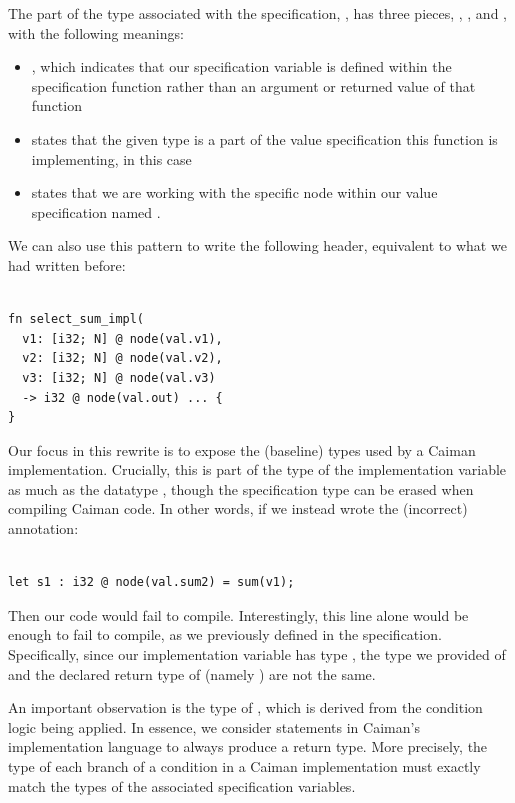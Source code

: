 The part of the type associated with the specification, , has three pieces, , , and , with the following meanings:
%
\begin{itemize}
	\item {}, which indicates that our specification variable is defined within the specification function rather than an argument or returned value of that function
	\item {} states that the given type is a part of the value specification this function is implementing,  in this case
	\item {} states that we are working with the specific node within our value specification named .
\end{itemize}
%
We can also use this pattern to write the following header, equivalent to what we had written before:
%
\begin{lstlisting}

fn select_sum_impl(
  v1: [i32; N] @ node(val.v1),
  v2: [i32; N] @ node(val.v2),
  v3: [i32; N] @ node(val.v3)
  -> i32 @ node(val.out) ... {
}
\end{lstlisting}
%
Our focus in this rewrite is to expose the (baseline) types used by a Caiman implementation. Crucially, this is part of the type of the implementation variable as much as the datatype , though the specification type can be erased when compiling Caiman code.  In other words, if we instead wrote the (incorrect) annotation:
%
\begin{lstlisting}

let s1 : i32 @ node(val.sum2) = sum(v1);
\end{lstlisting}
%
Then our code would fail to compile.  Interestingly, this line alone would be enough to fail to compile, as we previously defined  in the specification.   Specifically, since our implementation variable  has type , the type we provided of  and the declared return type of  (namely ) are not the same.

An important observation is the type of , which is derived from the  condition logic being applied.  In essence, we consider  statements in Caiman's implementation language to always produce a return type.  More precisely, the type of each branch of a condition in a Caiman implementation must exactly match the types of the associated specification variables.  

